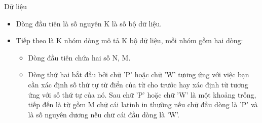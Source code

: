 Dữ liệu  
\begin{itemize}
	\item     Dòng đầu tiên là số nguyên K là số bộ dữ liệu.   
	\item     Tiếp theo là K nhóm dòng mô tả K bộ dữ liệu, mỗi nhóm gồm hai dòng:    
\begin{itemize}
	\item       Dòng đầu tiên chứa hai số N, M.     
	\item       Dòng thứ hai bắt đầu bởi chữ 'P' hoặc chữ 'W' tương ứng với việc bạn cần xác định số thứ tự từ điển của từ cho trước hay xác định từ tương ứng với số thứ tự của nó. Sau chữ 'P' hoặc chữ 'W' là một khoảng trống, tiếp đến là từ gồm M chữ cái latinh in thường nếu chữ đầu dòng là 'P' và là số nguyên dương nếu chữ cái đầu dòng là 'W'.     
\end{itemize}
\end{itemize}